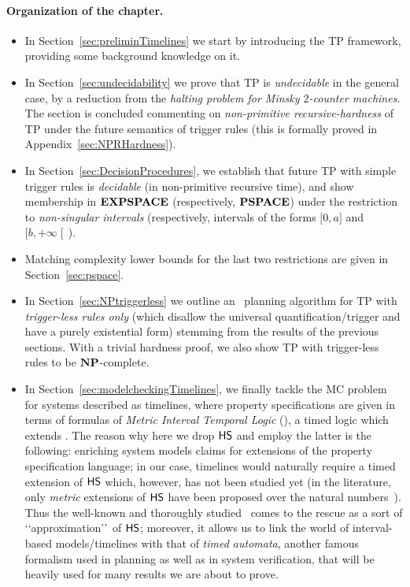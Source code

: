 \paragraph{Organization of the chapter.}
\begin{itemize}
    \item In Section~\ref{sec:preliminTimelines} we start by introducing the TP framework, providing some background knowledge on it. 
    \item In Section~\ref{sec:undecidability} we prove that TP is \emph{undecidable} in the general case, by a reduction from the \emph{halting problem for Minsky $2$-counter machines}. The section is concluded commenting on \emph{non-primitive recursive-hardness} of TP under the future semantics of trigger rules (this is formally proved in Appendix~\ref{sec:NPRHardness}).    
    \item In Section~\ref{sec:DecisionProcedures}, we establish that future TP with simple trigger rules is \emph{decidable} (in non-primitive recursive time), and show membership in $\textbf{EXPSPACE}$ (respectively, $\textbf{PSPACE}$) under the restriction to \emph{non-singular intervals} (respectively, intervals of the forms $\mathopen[0,a\mathclose]$ and $\mathopen[b,+\infty\mathclose[\,$).
    \item Matching complexity lower bounds for the last two restrictions are given in Section~\ref{sec:pspace}. 
    \item In Section~\ref{sec:NPtriggerless} we outline an \NP\ planning algorithm for TP with \emph{trigger-less rules only} (which disallow the universal quantification/trigger and have a purely existential form) stemming from the results of the previous sections. With a trivial hardness proof, we also show TP with trigger-less rules to be $\textbf{NP}$-complete.
    \item In Section~\ref{sec:modelcheckingTimelines}, we finally tackle the MC problem for systems described as timelines, where property specifications are given in terms of formulas of \emph{Metric Interval Temporal Logic} (\MITL), a timed logic which extends \LTL. The reason why here we drop $\text{\sffamily HS}$ and employ the latter is the following: enriching system models claims for extensions of the property specification language; in our case, timelines would naturally require a timed extension of $\text{\sffamily HS}$ which, however, has not been studied yet (in the literature, only \emph{metric} extensions of $\text{\sffamily HS}$ have been proposed over the natural numbers~\cite{DBLP:journals/sosym/BresolinMGMS13}).
    Thus the well-known and thoroughly studied \MITL\ comes to the rescue as a sort of \lq\lq approximation\rq\rq\ of $\text{\sffamily HS}$; moreover, it allows us to link the world of interval-based models/timelines with that of \emph{timed automata}, another famous formalism used in planning as well as in system verification, that will be heavily used for many results we are about to prove. 
\end{itemize}
